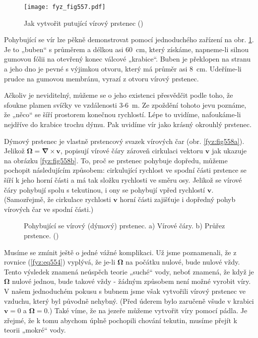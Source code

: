     \begin{figure}[ht!] %
      \centering
      \texttt{[image: fyz\_fig557.pdf]}
      \caption{Jak vytvořit putující vírový prstenec
               (\cite[s.~755]{Feynman02})}
      \label{fyz:fig557}
    \end{figure}
    
    Pohybující se vír lze pěkně demonstrovat pomocí jednoduchého zařízení na obr. \ref{fyz:fig557}. 
    Je to „buben“ s průměrem a délkou asi \SI{60}{cm}, který získáme, napneme-li silnou gumovou 
    fólii na otevřený konec válcové „krabice“. Buben je překlopen na stranu a jeho dno je pevné s 
    výjimkou otvoru, který má průměr asi \SI{8}{cm}. Udeříme-li prudce na gumovou membránu, vyrazí 
    z otvoru vírový prstenec.
    
    Ačkoliv je neviditelný, můžeme se o jeho existenci přesvědčit podle toho, že sfoukne plamen 
    svíčky ve vzdálenosti \num{3}-\SI{6}{m}. Ze zpoždění tohoto jevu poznáme, že „něco“ se šíří 
    prostorem konečnou rychlostí. Lépe to uvidíme, nafoukáme-li nejdříve do krabice trochu dýmu. 
    Pak uvidíme vír jako krásný okrouhlý prstenec.
    
    Dýmový prstenec je vlastně prstencový svazek vírových čar (obr. \ref{fyz:fig558a}). Jelikož 
    \(\symbf{\Omega} = \symbf{\nabla}\times\bm{v}\), popisují vírové čáry zároveň cirkulaci vektoru 
    \(\bm{v}\) jak ukazuje na obrázku \ref{fyz:fig558b}. To, proč se prstenec pohybuje dopředu, 
    můžeme pochopit následujícím způsobem: cirkulující rychlost ve spodní části prstence se šíří k 
    jeho horní části a má tak složku rychlosti ve směru osy. Jelikož se vírové čáry pohybují spolu 
    s tekutinou, i ony se pohybují vpřed rychlostí \(\bm{v}\). (Samozřejmě, že cirkulace rychlosti 
    \(\bm{v}\) horní části zajišťuje i dopředný pohyb vírových čar ve spodní části.)
    
    \begin{figure}[ht!]
      \centering
      \caption{Pohybující se vírový (dýmový) prstenec. a) Vírové čáry. b) Průřez prstence.
               (\cite[s.~756]{Feynman02})}
    \end{figure}
    
    Musíme se zmínit ještě o jedné vážné komplikaci. Už jsme poznamenali, že z rovnice 
    (\ref{fyz:eq554}) vyplývá, že je-li \(\symbf{\Omega}\) na počátku nulové, bude nulové vždy. 
    Tento výsledek znamená neúspěch teorie „suché“ vody, neboť znamená, že když je 
    \(\symbf{\Omega}\) nulové jednou, bude takové vždy - žádným způsobem není možné vyrobit víry. V 
    našem jednoduchém pokusu s bubnem jsme však vytvořili vírový prstenec ve vzduchu, který byl 
    původně nehybný. (Před úderem bylo zaručeně všude v krabici \(\bm{v} = 0\) a 
    \(\symbf{\Omega}=0\).) Také víme, že na jezeře můžeme vytvořit víry pomocí pádla. Je zřejmé, že 
    k tomu abychom úplně pochopili chování tekutin, musíme přejít k teorii „mokré“ vody.
    
